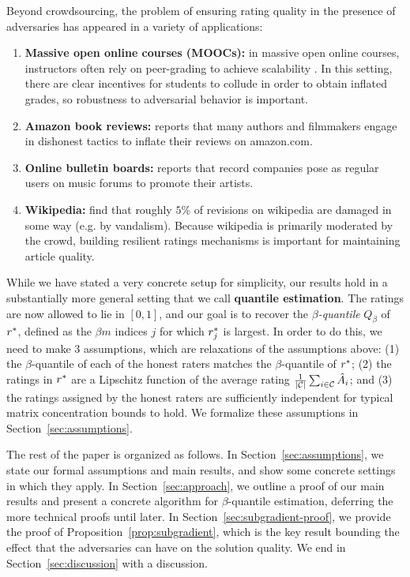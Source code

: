 Beyond crowdsourcing, the problem of ensuring rating quality in the presence 
of adversaries has appeared in a variety of applications:
\begin{enumerate}
\item \textbf{Massive open online courses (MOOCs):} in massive open online 
      courses, instructors often rely on peer-grading to achieve scalability 
      \citep{piech2013tuned}. In this setting, there are clear incentives for 
      students to collude in order to obtain inflated grades, so robustness to 
      adversarial behavior is important.
\item \textbf{Amazon book reviews:} \citet{harmon2004amazon} reports that 
      many authors and filmmakers engage in dishonest tactics to inflate 
      their reviews on amazon.com.
\item \textbf{Online bulletin boards:} \citet{white1999chatting} reports that 
      record companies pose as regular users on music forums to promote their 
      artists.
\item \textbf{Wikipedia:} \citet{priedhorsky2007creating} find that roughly 
      $5\%$ of revisions on 
      wikipedia are damaged in some way (e.g. by vandalism). Because wikipedia 
      is primarily moderated by the crowd, building resilient ratings mechanisms 
      is important for maintaining article quality.
\end{enumerate}


While we have stated a very concrete setup for simplicity, our results 
hold in a substantially more general setting that we call \textbf{quantile 
estimation}. The ratings are now allowed to lie in $[0,1]$, and 
our goal is to recover the \emph{$\beta$-quantile} $Q_{\beta}$ of 
$r^*$, defined as the $\beta m$ indices $j$ for which $r^*_j$ is largest. 
In order to do this, we need to make $3$ assumptions, which are relaxations of 
the assumptions above: (1) the $\beta$-quantile of each of the honest raters 
matches the $\beta$-quantile of $r^*$; (2) the ratings in $r^*$ are a 
Lipschitz function of the average rating 
$\frac{1}{|\mathcal{C}|}\sum_{i \in \mathcal{C}} \hat{A}_i$; and (3) the ratings assigned by 
the honest raters are sufficiently independent for typical matrix 
concentration bounds to hold. We formalize these assumptions in 
Section~\ref{sec:assumptions}. 

The rest of the paper is organized as follows. In Section~\ref{sec:assumptions}, 
we state our formal assumptions and main results, and show some concrete 
settings in which they apply. In Section~\ref{sec:approach}, we outline a proof 
of our main results and present a concrete algorithm for $\beta$-quantile 
estimation, deferring the more technical proofs until later. 
In Section~\ref{sec:subgradient-proof}, we provide the proof of 
Proposition~\ref{prop:subgradient}, which is the key result bounding the effect 
that the adversaries can have on the solution quality. We end in 
Section~\ref{sec:discussion} with a discussion.
